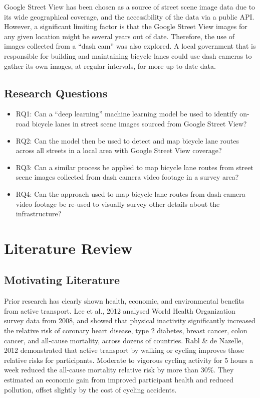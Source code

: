 \documentclass[11pt,twoside]{report}
\begin{document}
Google Street View has been chosen as a source of street scene image data due to its wide geographical coverage, and the accessibility of the data via a public API.  However, a significant limiting factor is that the Google Street View images for any given location might be several years out of date.  Therefore, the use of images collected from a ``dash cam'' was also explored.  A local government that is responsible for building and maintaining bicycle lanes could use dash cameras to gather its own images, at regular intervals, for more up-to-date data.

\section{Research Questions}
\begin{itemize}
\item{RQ1: Can a ``deep learning'' machine learning model be used to identify on-road bicycle lanes in street scene images sourced from Google Street View?}
\item{RQ2: Can the model then be used to detect and map bicycle lane routes across all streets in a local area with Google Street View coverage?}
\item{RQ3: Can a similar process be applied to map bicycle lane routes from street scene images collected from dash camera video footage in a survey area?}
\item{RQ4: Can the approach used to map bicycle lane routes from dash camera video footage be re-used to visually survey other details about the infrastructure?}
\end{itemize}


\chapter{Literature Review}


\section{Motivating Literature}

Prior research has clearly shown health, economic, and environmental benefits from active transport.  Lee et al., 2012 \cite{LEE2012219} analysed World Health Organization survey data from 2008, and showed that physical inactivity significantly increased the relative risk of coronary heart disease, type 2 diabetes, breast cancer, colon cancer, and all-cause mortality, across dozens of countries.  Rabl \& de Nazelle, 2012 \cite{RABL2012121} demonstrated that active transport by walking or cycling improves those relative risks for participants.  Moderate to vigorous cycling activity for 5 hours a week reduced the all-cause mortality relative risk by more than 30\%.  They estimated an economic gain from improved participant health and reduced pollution, offset slightly by the cost of cycling accidents.
\end{document}
